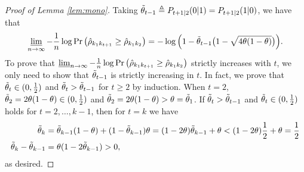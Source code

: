 \begin{proof}[Proof of Lemma \ref{lem:mono}]
	Taking $\tilde{\theta}_{t-1}\triangleq P_{t+1|2}(0|1)=P_{t+1|2}(1|0)$, we have that
	\begin{align}
		\varliminf_{n\rightarrow \infty}-\frac{1}{n}\log\Pr\big(\hat{\rho}_{k_{1}k_{t+1}}\geq \hat{\rho}_{k_{1}k_{2}}\big)=-\log\Big(1-\tilde{\theta}_{t-1}\big(1-\sqrt{4\theta(1-\theta)}\big)\Big).
	\end{align}
	To prove that $\varliminf_{n\rightarrow \infty}-\frac{1}{n}\log \Pr\big(\hat{\rho}_{k_{1}k_{t+1}}\geq \hat{\rho}_{k_{1}k_{2}}\big)$ strictly increases with   $t$, we only need to show that 
	$\tilde{\theta}_{t-1}$ is strictly increasing in $t$. In fact, we prove that $\tilde{\theta}_{t}\in(0,\frac{1}{2})$ and $\tilde{\theta}_{t}>\tilde{\theta}_{t-1}$ for $t\geq 2$ by induction. When 
	$t=2$, $\tilde{\theta}_{2}=2\theta(1-\theta)\in (0,\frac{1}{2})$ and $\tilde{\theta}_{2}=2\theta(1-\theta)>\theta=\tilde{\theta}_{1}$. If $\tilde{\theta}_{t}>\tilde{\theta}_{t-1}$ and $\tilde{\theta}_{t}\in(0,\frac{1}{2})$ holds 
	for $t=2,\ldots,k-1$, then for $t=k$ we have
	\begin{align}
		\tilde{\theta}_{k}&=\tilde{\theta}_{k-1}(1-\theta)+(1-\tilde{\theta}_{k-1})\theta=(1-2\theta)\tilde{\theta}_{k-1}+\theta<(1-2\theta)\frac{1}{2}+\theta=\frac{1}{2}\\*
		\tilde{\theta}_{k}-\tilde{\theta}_{k-1}&=\theta(1-2\tilde{\theta}_{k-1})>0,
	\end{align}
	as desired.
\end{proof}

